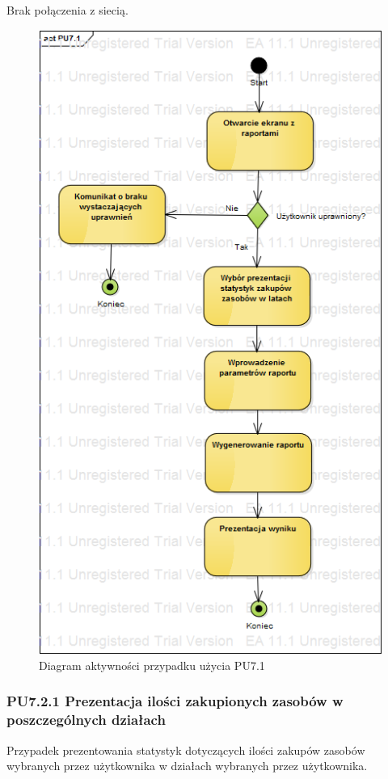 Brak połączenia z siecią.

\begin{figure}[h!]
	\centering
	\includegraphics[scale=0.6]{img/diagrams/activityDiagrams/PU71.png}
	\caption{Diagram aktywności przypadku użycia PU7.1 \label{fig:labelADPU7.1}}
\end{figure}

\subsubsection{PU7.2.1 Prezentacja ilości zakupionych zasobów w poszczególnych działach}
Przypadek prezentowania statystyk dotyczących ilości zakupów zasobów wybranych przez użytkownika w działach wybranych przez użytkownika.

